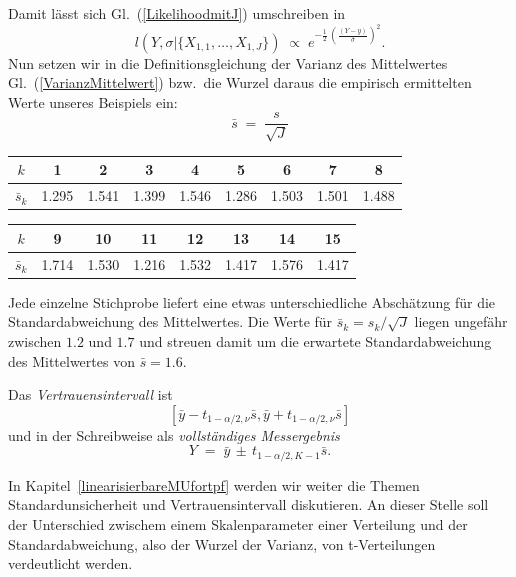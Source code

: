Damit lässt sich Gl.~(\ref{LikelihoodmitJ}) umschreiben in
\begin{equation}
l(Y, \sigma | \{X_{1,1}, \dots, X_{1,J}\}) \; \propto \;
 e^{- \frac{1}{2} \, \left( \frac{(Y - y)}{\bar \sigma} \right)^2 } .
\end{equation}
Nun setzen wir in die Definitionsgleichung
der Varianz des Mittelwertes Gl.~(\ref{VarianzMittelwert}) bzw.\
die Wurzel daraus die empirisch ermittelten Werte unseres Beispiels ein:
\begin{equation}
\bar s \; = \; \frac{s}{\sqrt{J}}
\label{empirischeVarianzMittelwert}
\end{equation}

\begin{tabular}{c||c|c|c|c|c|c|c|c}
$k$   &  1     &    2   &    3   &   4    &    5   &   6    &   7    &   8   \\
\hline\hline
$\bar s_k$ &  1.295 &  1.541 &  1.399 &  1.546 &  1.286 &  1.503 &  1.501 &  1.488\\
\end{tabular}

\vspace{3mm}

\begin{tabular}{c||c|c|c|c|c|c|c}
$k$   &  9     &    10  &   11   &   12   &   13   &   14   &   15  \\
\hline\hline
$\bar s_k$ &  1.714 &  1.530 &  1.216 &  1.532 &  1.417 &  1.576 &  1.417\\
\end{tabular}

Jede einzelne Stichprobe liefert eine etwas unterschiedliche Abschätzung für die
Standardabweichung des Mittelwertes. Die Werte für $\bar s_k=s_k/\sqrt{J}$ liegen ungefähr
zwischen $1.2$ und $1.7$ und streuen damit um die erwartete Standardabweichung des Mittelwertes von
$\bar s=1.6$. 

Das \textsl{Vertrauensintervall} ist 
$$
[\bar y - t_{1-\alpha/2,\nu} \bar s,
\bar y + t_{1-\alpha/2,\nu} \bar s]
$$
und in der Schreibweise als \textsl{vollständiges Messergebnis}
\begin{equation}
Y \; = \; \bar y \, \pm \, t_{1-\alpha/2,K-1} \bar s .
\label{vollstaendigesErgebMittelwert}
\end{equation}



In Kapitel~\ref{linearisierbareMUfortpf} werden wir weiter die Themen \glqq Standardunsicherheit\grqq{} und \glqq Vertrauensintervall\grqq{} diskutieren. An dieser Stelle soll der Unterschied zwischem einem Skalenparameter einer Verteilung und der Standardabweichung, also der Wurzel der Varianz, von t-Verteilungen verdeutlicht werden.

